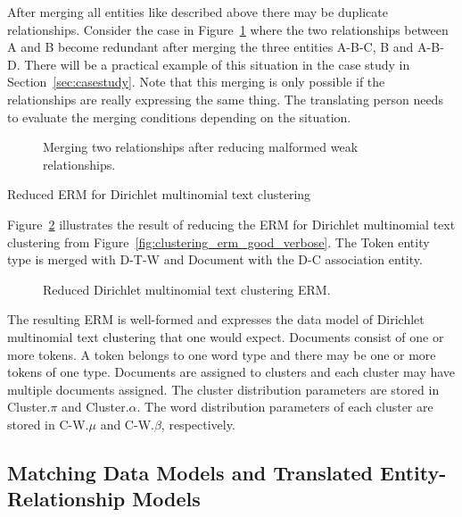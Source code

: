 After merging all entities like described above there may be duplicate relationships. Consider the case in Figure~\ref{fig:erm_reduction_minimal_example} where the two relationships between A and B become redundant after merging the three entities A-B-C, B and A-B-D. There will be a practical example of this situation in the case study in Section~\ref{sec:casestudy}. Note that this merging is only possible if the relationships are really expressing the same thing. The translating person needs to evaluate the merging conditions depending on the situation.

\begin{figure}[t]
\centering
\scalebox{\tikzScale}{\adjustTikzSize }
\caption[Merging two relationships after reducing malformed weak relationships]{Merging two relationships after reducing malformed weak relationships.}\label{fig:erm_reduction_minimal_example}
\end{figure}

\begin{Example}{Reduced ERM for Dirichlet multinomial text clustering}

Figure~\ref{fig:clustering_erm_good_reduced} illustrates the result of reducing the ERM for Dirichlet multinomial text clustering from Figure~\ref{fig:clustering_erm_good_verbose}. The Token entity type is merged with D-T-W and Document with the D-C association entity.

\begin{figure}[h]
\centering
\scalebox{\tikzScale}{\adjustTikzSize }
\caption[Reduced Dirichlet multinomial text clustering ERM]{Reduced Dirichlet multinomial text clustering ERM.}\label{fig:clustering_erm_good_reduced}
\end{figure}

The resulting ERM is well-formed and expresses the data model of Dirichlet multinomial text clustering that one would expect. Documents consist of one or more tokens. A token belongs to one word type and there may be one or more tokens of one type. Documents are assigned to clusters and each cluster may have multiple documents assigned. The cluster distribution parameters are stored in Cluster.$\pi$ and Cluster.$\alpha$. The word distribution parameters of each cluster are stored in C-W.$\mu$ and C-W.$\beta$, respectively.

\end{Example}

\subsection{Matching Data Models and Translated Entity-Relationship Models}
\label{sec:erm_matching}

